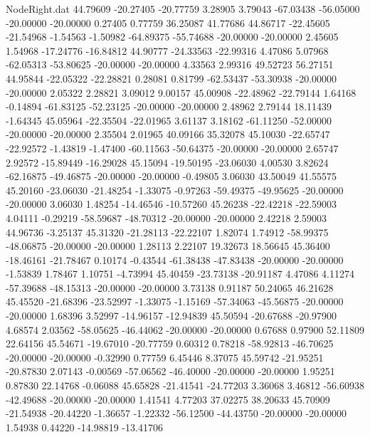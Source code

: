 \begin{filecontents}{NodeRight.dat}
  44.79609  -20.27405  -20.77759     3.28905    3.79043  -67.03438  -56.05000  -20.00000  -20.00000    0.27405    0.77759   36.25087   41.77686
  44.86717  -22.45605  -21.54968    -1.54563   -1.50982  -64.89375  -55.74688  -20.00000  -20.00000    2.45605    1.54968  -17.24776  -16.84812
  44.90777  -24.33563  -22.99316     4.47086    5.07968  -62.05313  -53.80625  -20.00000  -20.00000    4.33563    2.99316   49.52723   56.27151
  44.95844  -22.05322  -22.28821     0.28081    0.81799  -62.53437  -53.30938  -20.00000  -20.00000    2.05322    2.28821    3.09012    9.00157
  45.00908  -22.48962  -22.79144     1.64168   -0.14894  -61.83125  -52.23125  -20.00000  -20.00000    2.48962    2.79144   18.11439   -1.64345
  45.05964  -22.35504  -22.01965     3.61137    3.18162  -61.11250  -52.00000  -20.00000  -20.00000    2.35504    2.01965   40.09166   35.32078
  45.10030  -22.65747  -22.92572    -1.43819   -1.47400  -60.11563  -50.64375  -20.00000  -20.00000    2.65747    2.92572  -15.89449  -16.29028
  45.15094  -19.50195  -23.06030     4.00530    3.82624  -62.16875  -49.46875  -20.00000  -20.00000   -0.49805    3.06030   43.50049   41.55575
  45.20160  -23.06030  -21.48254    -1.33075   -0.97263  -59.49375  -49.95625  -20.00000  -20.00000    3.06030    1.48254  -14.46546  -10.57260
  45.26238  -22.42218  -22.59003     4.04111   -0.29219  -58.59687  -48.70312  -20.00000  -20.00000    2.42218    2.59003   44.96736   -3.25137
  45.31320  -21.28113  -22.22107     1.82074    1.74912  -58.99375  -48.06875  -20.00000  -20.00000    1.28113    2.22107   19.32673   18.56645
  45.36400  -18.46161  -21.78467     0.10174   -0.43544  -61.38438  -47.83438  -20.00000  -20.00000   -1.53839    1.78467    1.10751   -4.73994
  45.40459  -23.73138  -20.91187     4.47086    4.11274  -57.39688  -48.15313  -20.00000  -20.00000    3.73138    0.91187   50.24065   46.21628
  45.45520  -21.68396  -23.52997    -1.33075   -1.15169  -57.34063  -45.56875  -20.00000  -20.00000    1.68396    3.52997  -14.96157  -12.94839
  45.50594  -20.67688  -20.97900     4.68574    2.03562  -58.05625  -46.44062  -20.00000  -20.00000    0.67688    0.97900   52.11809   22.64156
  45.54671  -19.67010  -20.77759     0.60312    0.78218  -58.92813  -46.70625  -20.00000  -20.00000   -0.32990    0.77759    6.45446    8.37075
  45.59742  -21.95251  -20.87830     2.07143   -0.00569  -57.06562  -46.40000  -20.00000  -20.00000    1.95251    0.87830   22.14768   -0.06088
  45.65828  -21.41541  -24.77203     3.36068    3.46812  -56.60938  -42.49688  -20.00000  -20.00000    1.41541    4.77203   37.02275   38.20633
  45.70909  -21.54938  -20.44220    -1.36657   -1.22332  -56.12500  -44.43750  -20.00000  -20.00000    1.54938    0.44220  -14.98819  -13.41706

\end{filecontents}
